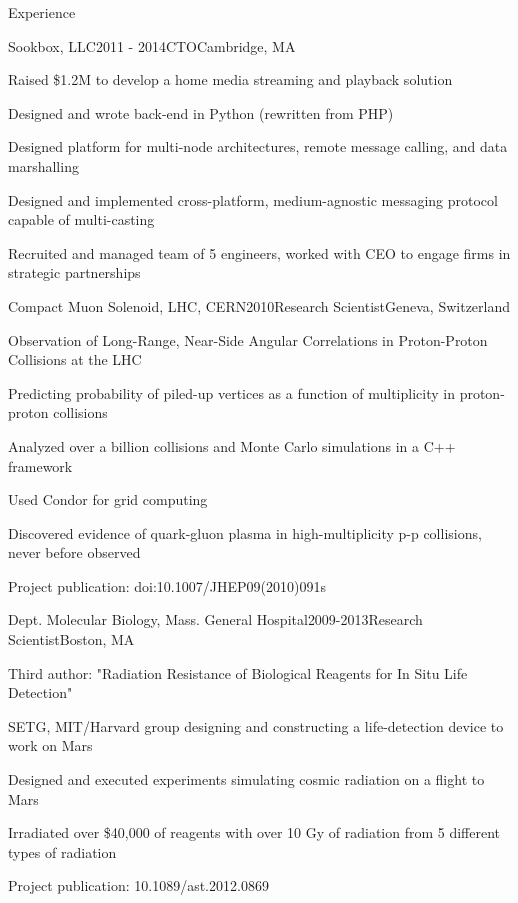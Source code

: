 \documentclass{resume}
\begin{document}

\begin{rSection}{Experience}

\begin{rSubsection}{Sookbox, LLC}{2011 - 2014}{CTO}{Cambridge, MA}
\item Raised \$1.2M to develop a home media streaming and playback solution
\item Designed and wrote back-end in Python (rewritten from PHP)
\item Designed platform for multi-node architectures, remote message calling, and data marshalling
\item Designed and implemented cross-platform, medium-agnostic messaging protocol capable of multi-casting
\item Recruited and managed team of 5 engineers, worked with CEO to engage firms in strategic partnerships
\end{rSubsection}

\begin{rSubsection}{Compact Muon Solenoid, LHC, CERN}{2010}{Research Scientist}{Geneva, Switzerland}
\item Observation of Long-Range, Near-Side Angular Correlations in Proton-Proton Collisions at the LHC
\item Predicting probability of piled-up vertices as a function of multiplicity in proton-proton collisions
\item Analyzed over a billion collisions and Monte Carlo simulations in a C++ framework
\item Used Condor for grid computing
\item Discovered evidence of quark-gluon plasma in high-multiplicity p-p collisions, never before observed
\item Project publication: doi:10.1007/JHEP09(2010)091s
\end{rSubsection}


\begin{rSubsection}{Dept. Molecular Biology, Mass. General Hospital}{2009-2013}{Research Scientist}{Boston, MA}
\item Third author: "Radiation Resistance of Biological Reagents for In Situ Life Detection"
\item SETG, MIT/Harvard group designing and constructing a life-detection device to work on Mars
\item Designed and executed experiments simulating cosmic radiation on a flight to Mars
\item Irradiated over \$40,000 of reagents with over 10 Gy of radiation from 5 different types of radiation
\item Project publication: 10.1089/ast.2012.0869
\end{rSubsection}



\end{rSection}
\end{document}
